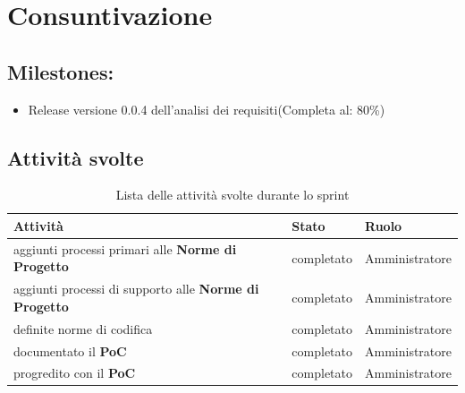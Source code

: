\section{Consuntivazione}

\subsection{Milestones:}
\begin{itemize}
    \item Release versione 0.0.4 dell'analisi dei requisiti(Completa al: 80\%)
\end{itemize}

\subsection{Attività svolte}

\begin{table}[ht]
    \begin{tabularx}{\textwidth}{X l l}
        
        \rowcolor{gray!30} \textbf{Attività} & \textbf{Stato} & \textbf{Ruolo}\\
        
        \hline
        aggiunti processi primari alle \textbf{Norme di Progetto} & completato & Amministratore\\
        aggiunti processi di supporto alle \textbf{Norme di Progetto} & completato & Amministratore\\
        definite norme di codifica & completato & Amministratore\\
        documentato il \textbf{PoC} & completato & Amministratore\\
        progredito con il \textbf{PoC}& completato & Amministratore\\
        \end{tabularx}
    \caption{Lista delle attività svolte durante lo sprint}
\end{table}


